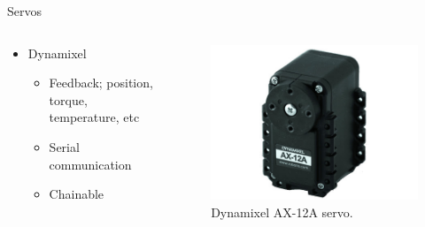 \documentclass{beamer}
\begin{document}
\begin{frame}{Servos}

    \begin{columns}
        \begin{column}[]{0.5\textwidth}
            \begin{itemize}
                \item Dynamixel
                \begin{itemize}
                    \item Feedback; position, torque, temperature, etc
                    \item Serial communication
                    \item Chainable
                \end{itemize}
            \end{itemize}
        \end{column}
        
        
        \begin{column}[]{0.5\textwidth}
            \begin{figure}
                \centering
                \includegraphics[width = \textwidth]{img/ax12a.jpg}
                \caption{Dynamixel AX-12A servo.}
            \end{figure}
            
        \end{column}
    \end{columns}
    
\end{frame}


\end{document}
